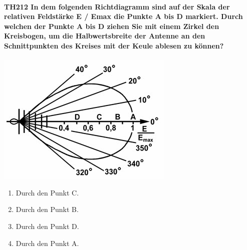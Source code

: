 \documentclass[8pt]{article}
\begin{document}
\paragraph*{TH212 In dem folgenden Richtdiagramm sind auf der Skala der relativen Feldstärke E / Emax die Punkte A bis D markiert. Durch welchen der Punkte A bis D ziehen Sie mit einem Zirkel den Kreisbogen, um die Halbwertsbreite der Antenne an den Schnittpunkten des Kreises mit der Keule ablesen zu können?}
\begin{center}
	\begin{minipage}{\linewidth}
		\centering
		\includegraphics[scale=1.0]{pics/th212_a.jpg}
	\end{minipage}
\end{center}
\begin{enumerate}[nolistsep,label=\Alph*]
\item Durch den Punkt C.
\item Durch den Punkt B.
\item Durch den Punkt D.
\item Durch den Punkt A.
\end{enumerate}
\end{document}
